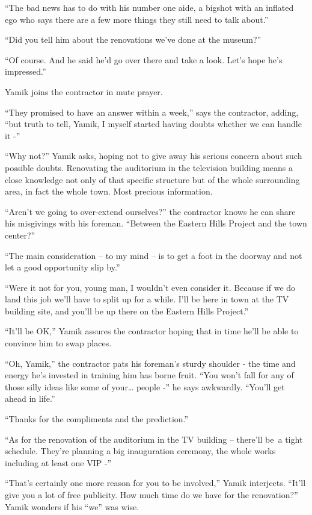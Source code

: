 \documentclass[twoside,11pt]{book}
\begin{document}
``The bad news has to do with his number one aide, a bigshot with an inflated ego who says there are a few
more things they still need to talk about.''

``Did you tell him about the renovations we've done at the museum?''

``Of course. And he said he'd go over there and take a look. Let's hope he's impressed.''

Yamik joins the contractor in mute prayer.

``They promised to have an answer within a week,'' says the contractor{,}
adding, ``but truth to tell, Yamik, I myself started having doubts whether we can handle it
-''

``Why not?'' Yamik asks, hoping not to give away his serious{ }concern about
such possible doubts. Renovating the auditorium in the television building means a close knowledge not only of that
specific structure but of the whole surrounding area, in fact the whole town. Most precious information. ~

``Aren't we going to over-extend ourselves?'' the contractor knows he can share his misgivings
with his foreman. ``Between the Eastern Hills Project and the town center?''

``The main consideration -- to my mind -- is to get a foot in the doorway and not let a good opportunity
slip by.''

``Were it not for you, young man, I wouldn't even consider it. Because if we do land this job we'll have to
split up for a while. I'll be here in town at the TV building site, and you'll be up there on the Eastern Hills
Project.''

``It'll be OK,'' Yamik assures the contractor hoping that in time he'll be able to convince
him to swap places. ~

``Oh, Yamik,'' the contractor pats his foreman's sturdy shoulder - the time and energy he's
invested in training him has borne fruit. ``You won't fall for any of those silly ideas like some of
your{\dots} people -'' he says awkwardly. ``You'll get ahead in life.''

``Thanks for the compliments and the prediction.''

``As for the renovation of the auditorium in the TV building -- there'll be~a tight schedule. They're
planning a big inauguration ceremony, the whole works including at least one VIP -''

``That's certainly one more reason for you to be involved,'' Yamik interjects.
``It'll give you a lot of free publicity. How much time do we have for the renovation?''
Yamik wonders if his ``we'' was wise.
\end{document}
